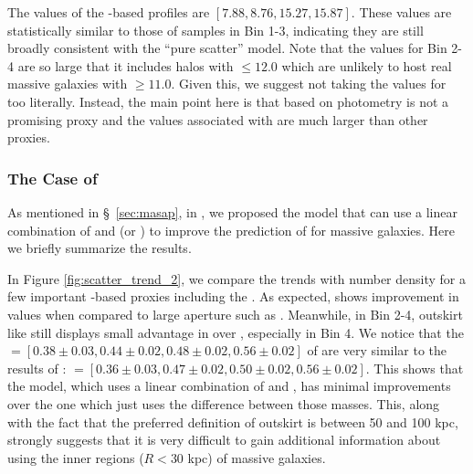 \documentclass[fleqn,usenatbib,useAMS]{mnras}
\begin{document}
    The \chisq{} values of the \mcmodel{}-based \dsigma{} profiles are $[7.88, 8.76, 15.27, 15.87]$.
    These values are statistically similar to those of  samples in Bin 1-3, indicating 
    they are still broadly consistent with the ``pure scatter'' model.
    Note that the \sigmvir{} values for Bin 2-4 are so large that it includes halos with
    \logmvir{}$\leq 12.0$ which are unlikely to host real massive galaxies with 
    \logmcmodel{}$\geq 11.0$. 
    Given this, we suggest not taking the \sigmvir{} values for \mcmodel{} too literally.
    Instead, the main point here is that \mstar{} based on \cmodel{} photometry is not a promising
    \mvir{} proxy and the \sigmvir{} values associated with \mcmodel{} are much larger than other
    proxies.

\subsubsection{The Case of \masap{}}
    \label{sec:asap_result}

    As mentioned in \S\ \ref{sec:masap}, in \citet{Huang2020}, we proposed the \asap{} model that
    can use a linear combination of  and  (or \mmax{}) to improve the 
    prediction of \mvir{} for massive galaxies. 
    Here we briefly summarize the results.

    In Figure \ref{fig:scatter_trend_2}, we compare the \sigmvir{} trends with number density 
    for a few important \mstar{}-based \mvir{} proxies including the \masap{}. 
    As expected, \masap{} shows improvement in \sigmvir{} values when compared to large aperture 
    \mstar{} such as .
    Meanwhile, in Bin 2-4, outskirt \mstar{} like  still displays small 
    advantage in \sigmvir{} over \masap{}, especially in Bin 4.
    We notice that the \sigmvir{}$=[0.38\pm0.03, 0.44\pm0.02, 0.48\pm0.02, 0.56\pm0.02]$ of \masap{}
    are very similar to the results of : 
    \sigmvir{}$=[0.36\pm0.03, 0.47\pm0.02, 0.50\pm0.02, 0.56\pm0.02]$.
    This shows that the \asap{} model, which uses a linear combination of 
    and , has minimal improvements over the one which just uses the difference between
    those masses. 
    This, along with the fact that the preferred definition of outskirt is between 50 and 100 kpc,
    strongly suggests that it is very difficult to gain additional information about \mvir{} using
    the inner regions ($R < 30$ kpc) of massive galaxies.
    
\end{document}
